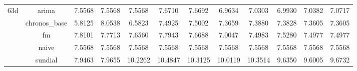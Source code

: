 \begin{table}[H]
{\begin{tabular}{cccccccccccc}
\multirow[c]{5}{*}{63d} & arima & 7.5568 & 7.5568 & 7.5568 & 7.6710 & 7.6692 & 6.9634 & 7.0303 & 6.9930 & 7.0382 & 7.0717 \\
 & chronos_base & 5.8125 & 8.0538 & 6.5823 & 7.4925 & 7.5002 & 7.3659 & 7.3880 & 7.3828 & 7.3605 & 7.3605 \\
 & fm & 7.8101 & 7.7713 & 7.6560 & 7.7943 & 7.6688 & 7.0047 & 7.4983 & 7.5280 & 7.4977 & 7.4977 \\
 & naive & 7.5568 & 7.5568 & 7.5568 & 7.5568 & 7.5568 & 7.5568 & 7.5568 & 7.5568 & 7.5568 & 7.5568 \\
 & sundial & 7.9463 & 7.9655 & 10.2262 & 10.4847 & 10.3125 & 10.0119 & 10.3514 & 9.6350 & 9.6005 & 9.6732 \\
\bottomrule
\end{tabular}

 }
\end{table}